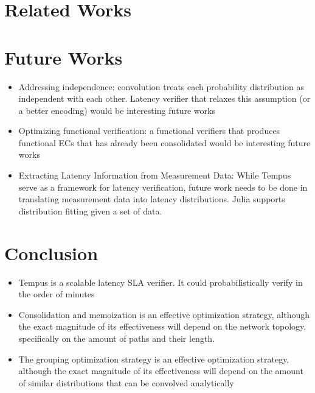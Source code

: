 \documentclass[10pt,sigconf,letterpaper,anonymous,nonacm]{acmart}
\begin{document}
\section{Related Works}

\section{Future Works}
\begin{itemize}
    \item Addressing independence: convolution treats each probability distribution as independent 
        with each other. Latency verifier that relaxes this assumption (or a better encoding) would be 
        interesting future works
    \item Optimizing functional verification: a functional verifiers that produces functional ECs that 
        has already been consolidated would be interesting future works
    \item Extracting Latency Information from Measurement Data: While Tempus serve as a framework for 
        latency verification, future work needs to be done in translating measurement data into latency 
        distributions. Julia supports distribution fitting given a set of data. 
\end{itemize}

\section{Conclusion}
\begin{itemize}
    \item Tempus is a scalable latency SLA verifier. It could probabilistically verify in the order of minutes
    \item Consolidation and memoization is an effective optimization strategy, although the exact magnitude of 
        its effectiveness will depend on the network topology, specifically on the amount of paths and their 
        length.
    \item The grouping optimization strategy is an effective optimization strategy, although the exact magnitude 
        of its effectiveness will depend on the amount of similar distributions that can be convolved analytically
\end{itemize}



\end{document}
